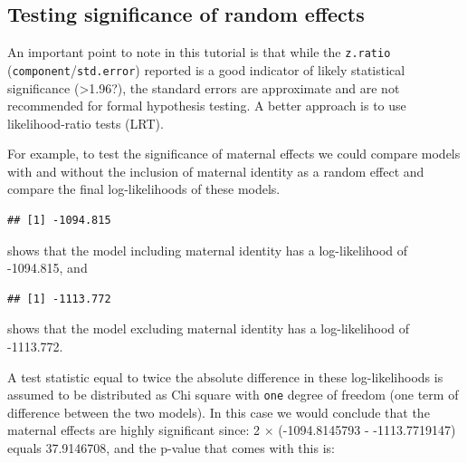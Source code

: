 \documentclass[
  12pt,
]{book}
\newenvironment{Shaded}{\begin{snugshade}}{\end{snugshade}}
\newcommand{\NormalTok}[1]{#1}
\newcommand{\OperatorTok}[1]{\textcolor[rgb]{0.81,0.36,0.00}{\textbf{#1}}}
\begin{document}
\hypertarget{testing-significance-of-random-effects}{%
\subsection{Testing significance of random effects}\label{testing-significance-of-random-effects}}

An important point to note in this tutorial is that while the \texttt{z.ratio} (\texttt{component}/\texttt{std.error}) reported is a good indicator of likely statistical significance (\textgreater1.96?), the standard errors are approximate and are not recommended for formal hypothesis testing. A better approach is to use likelihood-ratio tests (LRT).

For example, to test the significance of maternal effects we could compare models with and without the inclusion of maternal identity as a random effect and compare the final log-likelihoods of these models.

\begin{Shaded}
\end{Shaded}

\begin{verbatim}
## [1] -1094.815
\end{verbatim}

shows that the model including maternal identity has a log-likelihood of -1094.815, and

\begin{Shaded}
\end{Shaded}

\begin{verbatim}
## [1] -1113.772
\end{verbatim}

shows that the model excluding maternal identity has a log-likelihood of -1113.772.

A test statistic equal to twice the absolute difference in these log-likelihoods is assumed to be distributed as Chi square with \texttt{one} degree of freedom (one term of difference between the two models). In this case we would conclude that the maternal effects are highly significant since:
2 \(\times\) (-1094.8145793 - -1113.7719147) equals 37.9146708, and the p-value that comes with this is:
\end{document}
